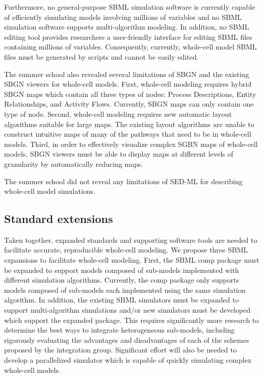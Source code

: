 \documentclass[journal,transmag]{IEEEtran}
\begin{document}
Furthermore, no general-purpose SBML simulation software is currently capable of efficiently simulating models involving millions of variables and no SBML simulation software supports multi-algorithm modeling. In addition, no SBML editing tool provides researchers a user-friendly interface for editing SBML files containing millions of variables. Consequently, currently, whole-cell model SBML files must be generated by scripts and cannot be easily edited.

The summer school also revealed several limitations of SBGN and the existing SBGN viewers for whole-cell models. First, whole-cell modeling requires hybrid SBGN maps which contain all three types of nodes: Process Descriptions, Entity Relationships, and Activity Flows. Currently, SBGN maps can only contain one type of node. Second, whole-cell modeling requires new automatic layout algorithms suitable for large maps. The existing layout algorithms are unable to construct intuitive maps of many of the pathways that need to be in whole-cell models. Third, in order to effectively visualize complex SGBN maps of whole-cell models, SBGN viewers must be able to display maps at different levels of granularity by automatically reducing maps.

The summer school did not reveal any limitations of SED-ML for describing whole-cell model simulations.

\subsection{Standard extensions}
Taken together, expanded standards and supporting software tools are needed to facilitate accurate, reproducible whole-cell modeling. We propose three SBML expansions to facilitate whole-cell modeling. First, the SBML comp package must be expanded to support models composed of sub-models implemented with different simulation algorithms. Currently, the comp package only supports models composed of sub-models each implemented using the same simulation algorithm. In addition, the existing SBML simulators must be expanded to support multi-algorithm simulations and/or new simulators must be developed which support the expanded package. This requires significantly more research to determine the best ways to integrate heterogeneous sub-models, including rigorously evaluating the advantages and disadvantages of each of the schemes proposed by the integration group. Significant effort will also be needed to develop a parallelized simulator which is capable of quickly simulating complex whole-cell models.
\end{document}

